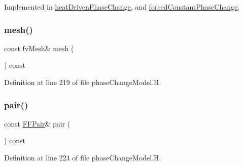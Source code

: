 Implemented in \hyperlink{classFoam_1_1phaseChangeModels_1_1heatDrivenPhaseChange_a26b9e463af1a7ec39a18891734bd0759}{heat\+Driven\+Phase\+Change}, and \hyperlink{classFoam_1_1phaseChangeModels_1_1forcedConstantPhaseChange_a26b9e463af1a7ec39a18891734bd0759}{forced\+Constant\+Phase\+Change}.

\mbox{\label{classFoam_1_1phaseChangeModel_a470f06cfb9b6ee887cd85d63de275607}} 
\subsubsection{\texorpdfstring{mesh()}{mesh()}}
{\footnotesize\ttfamily const fv\+Mesh\& mesh (\begin{DoxyParamCaption}{ }\end{DoxyParamCaption}) const\hspace{0.3cm}{\ttfamily [inline]}}



Definition at line 219 of file phase\+Change\+Model.\+H.

\mbox{\label{classFoam_1_1phaseChangeModel_a826deac453e9ba7c6fcda90d7b6b7709}} 
\subsubsection{\texorpdfstring{pair()}{pair()}}
{\footnotesize\ttfamily const \hyperlink{classFoam_1_1FFPair}{F\+F\+Pair}\& pair (\begin{DoxyParamCaption}{ }\end{DoxyParamCaption}) const\hspace{0.3cm}{\ttfamily [inline]}}



Definition at line 224 of file phase\+Change\+Model.\+H.

\mbox{\label{classFoam_1_1phaseChangeModel_a8a45a422be431da8423bc1d5cb290ca7}} 
